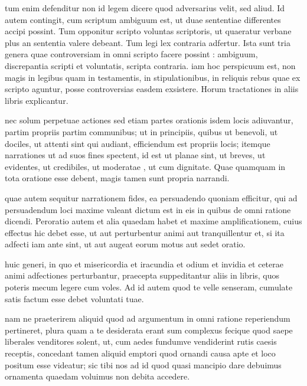  tum enim defenditur non id legem dicere quod adversarius velit, sed aliud. Id autem contingit, cum scriptum ambiguum est, ut duae sententiae differentes accipi possint. Tum opponitur scripto voluntas scriptoris, ut quaeratur verbane plus an sententia valere debeant. Tum legi lex contraria adfertur. Ista sunt tria genera quae controversiam in omni scripto facere possint : ambiguum, discrepantia scripti et voluntatis, scripta contraria. iam hoc perspicuum est, non magis in legibus quam in testamentis, in stipulationibus, in reliquis rebus quae ex scripto aguntur, posse controversias easdem exsistere. Horum tractationes in aliis libris explicantur.

 nec solum perpetuae actiones sed etiam partes orationis isdem locis adiuvantur, partim propriis partim communibus; ut in principiis, quibus ut benevoli, ut dociles, ut attenti sint qui audiant, efficiendum est propriis locis; itemque narrationes ut ad suos fines spectent, id est ut planae sint, ut breves, ut evidentes, ut credibiles, ut moderatae , ut cum dignitate. Quae quamquam in tota oratione esse debent, magis tamen sunt propria narrandi.

 quae autem sequitur narrationem fides, ea persuadendo quoniam efficitur, qui ad persuadendum loci maxime valeant dictum est in eis in quibus de omni ratione dicendi. Peroratio autem et alia quaedam habet et maxime amplificationem, cuius effectus hic debet esse, ut aut perturbentur animi aut tranquillentur et, si ita adfecti iam ante sint, ut aut augeat eorum motus aut sedet oratio.

 huic generi, in quo et misericordia et iracundia et odium et invidia et ceterae animi adfectiones perturbantur, praecepta suppeditantur aliis in libris, quos poteris mecum legere cum voles. Ad id autem quod te velle senseram, cumulate satis factum esse debet voluntati tuae.

 nam ne praeterirem aliquid quod ad argumentum in omni ratione reperiendum pertineret, plura quam a te desiderata erant sum complexus fecique quod saepe liberales venditores solent, ut, cum aedes fundumve vendiderint rutis caesis receptis, concedant tamen aliquid emptori quod ornandi causa apte et loco positum esse videatur; sic tibi nos ad id quod quasi mancipio dare debuimus ornamenta quaedam voluimus non debita accedere.
